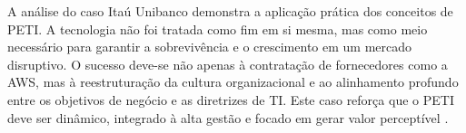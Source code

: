 \documentclass[12pt,a4paper,oneside]{article}
\begin{document}
A análise do caso Itaú Unibanco demonstra a aplicação prática dos conceitos de PETI. A tecnologia não foi tratada como fim em si mesma, mas como meio necessário para garantir a sobrevivência e o crescimento em um mercado disruptivo. O sucesso deve-se não apenas à contratação de fornecedores como a AWS, mas à reestruturação da cultura organizacional e ao alinhamento profundo entre os objetivos de negócio e as diretrizes de TI. Este caso reforça que o PETI deve ser dinâmico, integrado à alta gestão e focado em gerar valor perceptível \cite{kluyver2007}.



\end{document}
